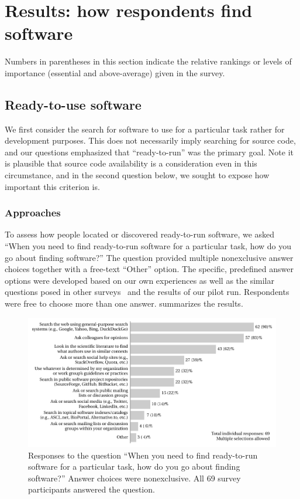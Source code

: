 \documentclass{casicswhitepaper}
\newcommand{\totalrespondents}{69\xspace}
\begin{document}
\section{Results: how respondents find software}

Numbers in parentheses in this section indicate the relative rankings or levels of importance (essential and above-average) given in the survey.


\subsection{Ready-to-use software}
 
We first consider the search for software to use for a particular task rather for development purposes. This does not necessarily imply searching for source code, and our questions emphasized that ``ready-to-run'' was the primary goal.  Note it is plausible that source code availability is a consideration even in this circumstance, and in the second question below, we sought to expose how important this criterion is.

 
\subsubsection{Approaches}
\label{approaches-ready-to-use}

To assess how people located or discovered ready-to-run software, we  asked ``When you need to find ready-to-run software for a particular task, how do you go about finding software?''  The question provided multiple nonexclusive answer choices together with a free-text ``Other'' option.  The specific, predefined answer options were developed based on our own experiences as well as the similar questions posed in other surveys~\cite{sim_2011, bajrachary_2009, linstead_2009} and the results of our pilot run.  Respondents were free to choose more than one answer.   summarizes the results.

\begin{figure}[htb]
  \centering
  \includegraphics[trim=0.1in 0.1in 0 0,width=6in]{files/plots/how-find-ready-to-run.pdf}
  \vspace*{-1ex}
  \caption{Responses to the question ``When you need to find ready-to-run software for a particular task, how do you go about finding software?'' Answer choices were nonexclusive. All \totalrespondents survey participants answered the question.}
  \label{how-find-ready-to-run}
\end{figure}
\end{document}
